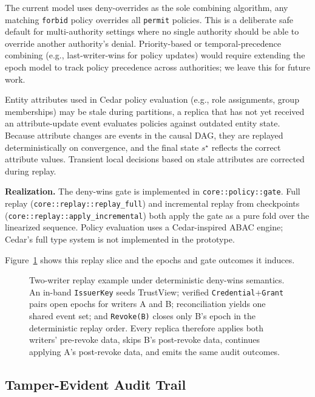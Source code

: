 \documentclass[10pt,journal,compsoc]{IEEEtran}
\begin{document}
The current model uses deny-overrides as the sole combining algorithm, any matching \texttt{forbid} policy overrides all \texttt{permit} policies. This is a deliberate safe default for multi-authority settings where no single authority should be able to override another authority's denial. Priority-based or temporal-precedence combining (e.g., last-writer-wins for policy updates) would require extending the epoch model to track policy precedence across authorities; we leave this for future work.

Entity attributes used in Cedar policy evaluation (e.g., role assignments, group memberships) may be stale during partitions, a replica that has not yet received an attribute-update event evaluates policies against outdated entity state. Because attribute changes are events in the causal DAG, they are replayed deterministically on convergence, and the final state $s^\star$ reflects the correct attribute values. Transient local decisions based on stale attributes are corrected during replay.

\textbf{Realization.} The deny-wins gate is implemented in \texttt{core::policy::gate}. Full replay (\texttt{core::replay::replay\_full}) and incremental replay from checkpoints (\texttt{core::replay::apply\_incremental}) both apply the gate as a pure fold over the linearized sequence. Policy evaluation uses a Cedar-inspired ABAC engine; Cedar's full type system is not implemented in the prototype.

Figure~\ref{fig:deny-wins} shows this replay slice and the epochs and gate outcomes it induces.

\begin{figure}[!htbp]
\centering
\resizebox{\textwidth}{!}{}
\caption{Two-writer replay example under deterministic deny-wins semantics. An in-band \texttt{IssuerKey} seeds TrustView; verified \texttt{Credential}+\texttt{Grant} pairs open epochs for writers A and B; reconciliation yields one shared event set; and \texttt{Revoke(B)} closes only B's epoch in the deterministic replay order. Every replica therefore applies both writers' pre-revoke data, skips B's post-revoke data, continues applying A's post-revoke data, and emits the same audit outcomes.}
\label{fig:deny-wins}
\end{figure}


\subsection{Tamper-Evident Audit Trail}
\end{document}
